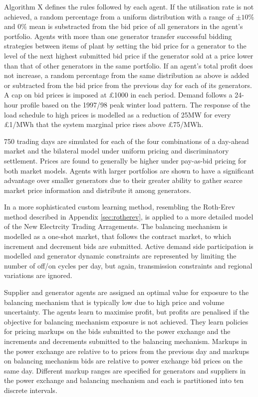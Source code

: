Algorithm X defines the rules followed by each agent.  If the
utilisation rate is not achieved, a random percentage from a uniform distribution with a
range of $\pm10\%$ and $0\%$ mean is substracted from the bid price of all
generators in the agent's portfolio.  Agents with more than one generator
transfer successful bidding strategies between items of plant by setting the
bid price for a generator to the level of the next highest submitted bid price if
the generator sold at a price lower than that of other generators in the same
portfolio.  If an agent's total profit does not increase, a random percentage
from the same distribution as above is added or subtracted from the bid price
from the previous day for each of its generators.  A cap on bid prices is
imposed at \pounds1000 in each period.  Demand follows a 24-hour profile based
on the 1997/98 peak winter load pattern.  The response of the load schedule to high prices is
modelled as a reduction of 25MW for every \pounds1/MWh that the system marginal
price rises above \pounds75/MWh.

750 trading days are simulated for each of the four combinations of a day-ahead
market and the bilateral model under uniform pricing and discriminatory
settlement.  Prices are found to generally be higher under pay-as-bid pricing
for both market models.  Agents with larger portfolios are shown to have a
significant advantage over smaller generators due to their greater ability to
gather scarce market price information and distribute it among generators.

In \cite{bower:2001b} a more sophisticated custom learning method, resembling
the Roth-Erev method described in Appendix \ref{sec:rotherev}, is applied to a
more detailed model of the New Electrcity Trading Arragements.  The balancing mechanism is modelled as a one-shot
market, that follows the contract market, to which increment and decrement
bids are submitted.  Active demand side participation is modelled
and generator dynamic constraints are represented by limiting the number of off/on
cycles per day, but again, transmission constraints and regional variations
are ignored.

Supplier and generator agents are assigned an optimal value for
exposure to the balancing mechanism that is typically low due to high price and
volume uncertainty.  The agents learn to maximise profit, but profits are
penalised if the objective for balancing mechanism exposure is not
achieved.  They learn policies for pricing markups on the bids submitted
to the power exchange and the increments and decrements submitted to the
balancing mechanism.  Markups in the power exchange are relative to to prices
from the previous day and markups on balancing mechanism bids are relative to
power exchange bid prices on the same day.  Different markup
ranges are specified for generators and suppliers in the power exchange and
balancing mechanism and each is partitioned into ten discrete intervals.


